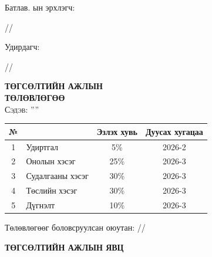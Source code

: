 
\begin{titlepage}

\vspace*{0.5cm}
Батлав. \deptname ын эрхлэгч: 
\begin{flushright}
\makebox[4cm]{\dotfill} /\chairname/ 
\end{flushright}

Удирдагч: 
\begin{flushright}
\makebox[4cm]{\dotfill} /\supname/
\end{flushright}

\begin{center}

\vspace*{2cm}
\textbf{{\large ТӨГСӨЛТИЙН АЖЛЫН \\ ТӨЛӨВЛӨГӨӨ}}\\[0.5cm]

\textsc{\large Сэдэв: ''\ttitle''}\\[0.5cm]

\begin{tabular}{|c|p{7cm}|c|c|}
	\hline
	№ & \makebox[7cm][c]{Ажлын бүлэг, хэсгийн нэр} & Эзлэх хувь & Дуусах хугацаа \\ \hline
	1 & {Удиртгал}         &  5\% & 2026-2 \\ \hline
	2 & {Онолын хэсэг}     & 25\% & 2026-3 \\ \hline
	3 & {Судалгааны хэсэг} & 30\% & 2026-3 \\ \hline
	4 & {Төслийн хэсэг}    & 30\% & 2026-3 \\ \hline
	5 & {Дүгнэлт}          & 10\% & 2026-3 \\ \hline
\end{tabular}

\vspace{2cm}
Төлөвлөгөөг боловсруулсан оюутан: \makebox[3cm]{\dotfill} /\shortname/

\end{center}

\newpage

\begin{center}

\vspace*{2cm}
\textbf{{\large ТӨГСӨЛТИЙН АЖЛЫН ЯВЦ}}\\[0.5cm]


\end{center}
\end{titlepage}
